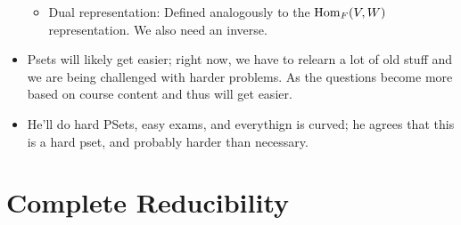 \documentclass[../notes.tex]{subfiles}
\begin{document}
\begin{itemize}
\begin{itemize}
        \item Dual representation: Defined analogously to the $\operatorname{Hom}_F(V,W)$ representation. We also need an inverse.
    \end{itemize}
    \item Psets will likely get easier; right now, we have to relearn a lot of old stuff and we are being challenged with harder problems. As the questions become more based on course content and thus will get easier.
    \item He'll do hard PSets, easy exams, and everythign is curved; he agrees that this is a hard pset, and probably harder than necessary.
\end{itemize}



\section{Complete Reducibility}
\end{document}
